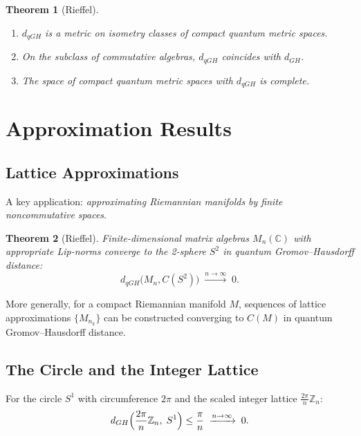 \documentclass[11pt,a4paper]{article}
\newtheorem{theorem}{Theorem}[section]
\begin{document}
\begin{theorem}[Rieffel]
\begin{enumerate}[nosep]
  \item $d_{qGH}$ is a metric on isometry classes of compact quantum metric spaces.
  \item On the subclass of commutative algebras, $d_{qGH}$ coincides with $d_{GH}$.
  \item The space of compact quantum metric spaces with $d_{qGH}$ is complete.
\end{enumerate}
\end{theorem}

\section{Approximation Results}

\subsection{Lattice Approximations}

A key application: \emph{approximating Riemannian manifolds by finite
noncommutative spaces}.

\begin{theorem}[Rieffel]
Finite-dimensional matrix algebras $M_n(\mathbb{C})$ with appropriate Lip-norms
converge to the 2-sphere $S^2$ in quantum Gromov--Hausdorff distance:
\begin{equation}
  d_{qGH}\bigl(M_n, C(S^2)\bigr) \;\xrightarrow{n \to \infty}\; 0.
\end{equation}
\end{theorem}

More generally, for a compact Riemannian manifold $M$, sequences of
lattice approximations $\{M_{n_k}\}$ can be constructed converging to
$C(M)$ in quantum Gromov--Hausdorff distance.

\subsection{The Circle and the Integer Lattice}

For the circle $S^1$ with circumference $2\pi$ and the scaled integer
lattice $\frac{2\pi}{n}\mathbb{Z}_n$:
\begin{equation}
  d_{GH}\Bigl(\frac{2\pi}{n}\mathbb{Z}_n,\; S^1\Bigr) \leq \frac{\pi}{n}
  \;\xrightarrow{n \to \infty}\; 0.
\end{equation}
\end{document}
